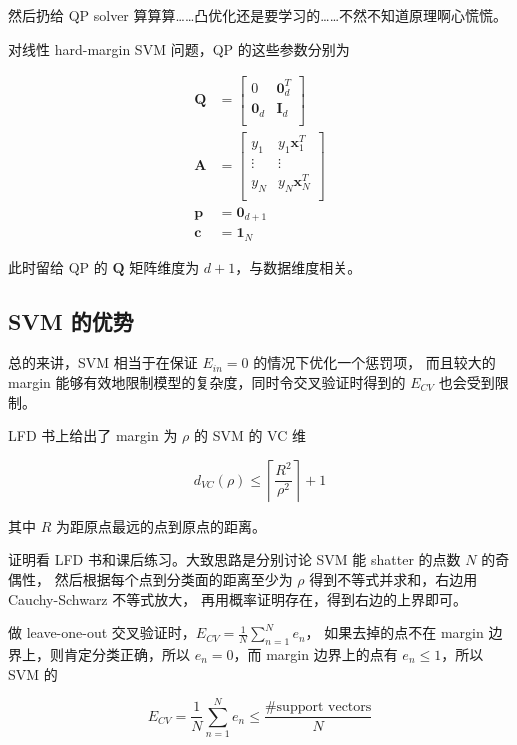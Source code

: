 \documentclass[a4paper]{article}
\begin{document}
然后扔给 QP solver 算算算……凸优化还是要学习的……不然不知道原理啊心慌慌。

对线性 hard-margin SVM 问题，QP 的这些参数分别为

\begin{equation}
\begin{aligned}
\mathbf{Q} &=
\begin{bmatrix}
0 & \mathbf{0}_d^{T} \\
\mathbf{0}_d & \mathbf{I}_d \\
\end{bmatrix} \\
\mathbf{A} &=
\begin{bmatrix}
y_1 & y_1\mathbf{x}_1^{T} \\
\vdots & \vdots \\
y_N & y_N\mathbf{x}_N^{T} \\
\end{bmatrix} \\
\mathbf{p} &= \mathbf{0}_{d+1} \\
\mathbf{c} &= \mathbf{1}_N
\end{aligned}
\end{equation}

此时留给 QP 的 $\mathbf{Q}$ 矩阵维度为 $d + 1$，与数据维度相关。



\subsection{SVM 的优势}

总的来讲，SVM 相当于在保证 $E_{in} = 0$ 的情况下优化一个惩罚项，
而且较大的 margin 能够有效地限制模型的复杂度，同时令交叉验证时得到的 $E_{CV}$
也会受到限制。

LFD 书上给出了 margin 为 $\rho$ 的 SVM 的 VC 维

$$\displaystyle d_{VC}(\rho) \le \left\lceil \frac{R^2}{\rho^2} \right\rceil + 1$$

其中 $R$ 为距原点最远的点到原点的距离。

证明看 LFD 书和课后练习。大致思路是分别讨论 SVM 能 shatter 的点数 $N$ 的奇偶性，
然后根据每个点到分类面的距离至少为 $\rho$ 得到不等式并求和，右边用 Cauchy-Schwarz 不等式放大，
再用概率证明存在，得到右边的上界即可。

做 leave-one-out 交叉验证时，$\displaystyle E_{CV} = \frac{1}{N}\sum_{n=1}^{N}e_n$，
如果去掉的点不在 margin 边界上，则肯定分类正确，所以 $e_n = 0$，而 margin
边界上的点有 $e_n \le 1$，所以 SVM 的 

$$\displaystyle E_{CV} = \frac{1}{N}\sum_{n=1}^{N}e_n \le \frac{\text{\# support vectors}}{N}$$
\end{document}
